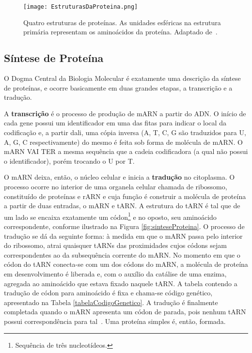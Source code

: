\begin{figure}[h]
    \centering
    \texttt{[image: EstruturasDaProteina.png]}
    \caption{Quatro estruturas de proteínas. As unidades esféricas na estrutura primária representam os aminoácidos da proteína. Adaptado de~\cite{drug09}.}
    \label{fig:EstruturasDaProteina}
\end{figure}

\subsection{Síntese de Proteína} \label{sinteseDeProteina}

\indent O Dogma Central da Biologia Molecular é exatamente uma descrição da síntese de proteínas, e ocorre basicamente em duas grandes etapas, a transcrição e a tradução.

\indent A \textbf{transcrição} é o processo de produção de mARN a partir do ADN. O início de cada gene possui um identificador em uma das fitas para indicar o local da codificação e, a partir dali, uma cópia inversa (A, T, C, G são traduzidos para U, A, G, C respectivamente) do mesmo é feita sob forma de molécula de mARN. O mARN VAI TER a mesma sequência que a cadeia codificadora (a qual não possui o identificador), porém trocando o U por T.

\indent O mARN deixa, então, o núcleo celular e inicia a \textbf{tradução} no citoplasma. O processo ocorre no interior de uma organela celular chamada de ribossomo, constituído de proteínas e rARN e cuja função é construir a molécula de proteína a partir de duas entradas, o mARN e tARN. A estrutura do tARN é tal que de um lado se encaixa exatamente um códon\footnote{Sequência de três nucleotídeos.} e no oposto, seu aminoácido correspondente, conforme ilustrado na Figura \ref{fig:sinteseProteina}. O processo de tradução se dá da seguinte forma: à medida em que o mARN passa pelo interior do ribossomo, atrai quaisquer tARNs das proximidades cujos códons sejam correspondentes ao da subsequência corrente do mARN. No momento em que o códon do tARN conecta-se com um dos códons do mARN, a molécula de proteína em desenvolvimento é liberada e, com o auxílio da catálise de uma enzima, agregada ao aminoácido que estava fixado naquele tARN. A tabela contendo a tradução de códon para aminoácido é fixa e chama-se código genético, apresentado na Tabela \ref{tabelaCodigoGenetico}. A tradução é finalmente completada quando o mARN apresenta um códon de parada, pois nenhum tARN possui correspondência para tal~\cite{setubal97}. Uma proteína simples é, então, formada. 

